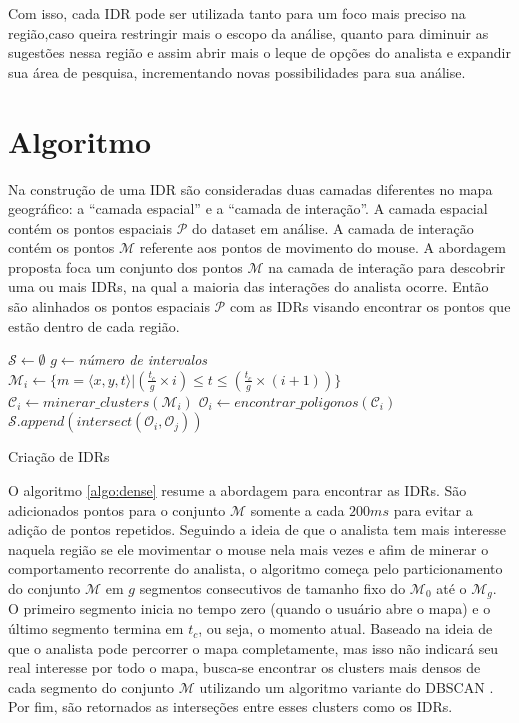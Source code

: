 Com isso, cada IDR pode ser utilizada tanto para um foco mais preciso na região,caso queira restringir mais o escopo da análise, quanto para diminuir as sugestões nessa região e assim abrir mais o leque de opções do analista e expandir sua área de pesquisa, incrementando novas possibilidades para sua análise.

\section{Algoritmo}

Na construção de uma IDR são consideradas duas camadas diferentes no mapa geográfico: a ``camada espacial'' e a ``camada de interação''. A camada espacial contém os pontos espaciais $\mathcal{P}$ do dataset em análise. A camada de interação  contém os pontos $\mathcal{M}$ referente aos pontos de movimento do mouse. A abordagem proposta foca um conjunto dos pontos $\mathcal{M}$ na camada de interação para descobrir uma ou mais IDRs, na qual a maioria das interações do analista ocorre. Então são alinhados os pontos espaciais $\mathcal{P}$ com as IDRs visando encontrar os pontos que estão dentro de cada região. 

\begin{algorithm}[!h]
        \DontPrintSemicolon
        $\mathcal{S} \gets \emptyset$\;
        $g \gets ${\em número de intervalos}\;
        {
               $\mathcal{M}_i \gets \{m = \langle x,y,t \rangle | (\frac{t_c}{g} \times i) \leq t \leq (\frac{t_c}{g} \times (i+1))\}$\;
               $\mathcal{C}_i \gets \mathit{minerar\_clusters}(\mathcal{M}_i)$\label{ln:mine}\;
               $\mathcal{O}_i \gets \mathit{encontrar\_poligonos}(\mathcal{C}_i)$\label{ln:poly}\;
        }
        {
            $\mathcal{S}.\mathit{append}(\mathit{intersect}(\mathcal{O}_i, \mathcal{O}_j))$
        }
        \;  
        \caption{Criação de IDRs}
        \label{algo:dense}
\end{algorithm}

O algoritmo \ref{algo:dense} resume a abordagem para encontrar as IDRs. São adicionados pontos para o conjunto $\mathcal{M}$ somente a cada $200ms$ para evitar a adição de pontos repetidos. Seguindo a ideia de que o analista tem mais interesse naquela região se ele movimentar o mouse nela mais vezes e afim de minerar o comportamento recorrente do analista, o algoritmo começa pelo particionamento do conjunto $\mathcal{M}$ em $g$ segmentos consecutivos de tamanho fixo do $\mathcal{M}_0$ até o $\mathcal{M}_g$. O primeiro segmento inicia no tempo zero (quando o usuário abre o mapa) e o último segmento termina em $t_c$, ou seja, o momento atual. Baseado na ideia de que o analista pode percorrer o mapa completamente, mas isso não indicará seu real interesse por todo o mapa, busca-se encontrar os clusters mais densos de cada segmento do conjunto $\mathcal{M}$ utilizando um algoritmo variante do DBSCAN \cite{Ester:1996:DAD:3001460.3001507}. Por fim, são retornados as interseções entre esses clusters como os IDRs.

